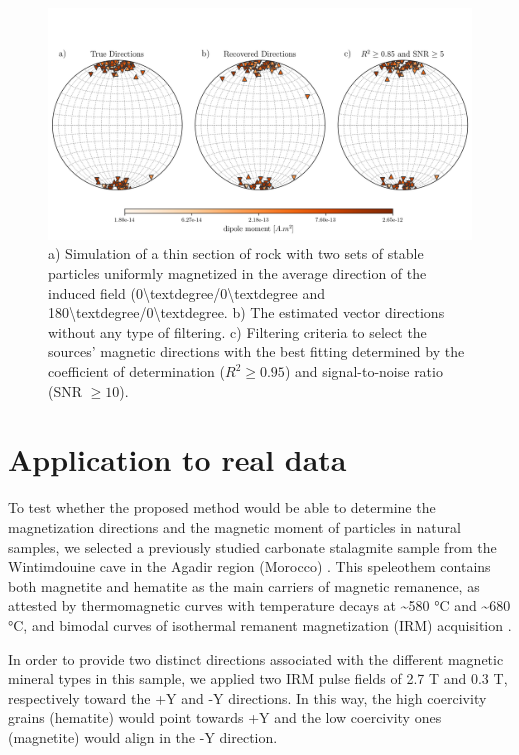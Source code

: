 \begin{figure}[htbp!]
\centering
\includegraphics[width=1\linewidth]{figures/complex-synthetic-stereograms.png}
\caption{
a) Simulation of a thin section of rock with two sets of stable particles uniformly magnetized in the average direction of the induced field (0{\textbackslash}textdegree/0{\textbackslash}textdegree and 180{\textbackslash}textdegree/0{\textbackslash}textdegree. b) The estimated vector directions without any type of filtering. c) Filtering criteria to select the sources' magnetic directions with the best fitting determined by the coefficient of determination ($R^ 2 \geq 0.95$) and signal-to-noise ratio (SNR $ \geq 10$).
}
\label{complex-synthetic-stereograms}
\end{figure}



\section{Application to real data}

To test whether the proposed method would be able to determine the
magnetization directions and the magnetic moment of particles in natural
samples, we selected a previously studied carbonate stalagmite sample from the
Wintimdouine cave in the Agadir region (Morocco) \citep{Ait2019Hydro}. This
speleothem contains both magnetite and hematite as the main carriers of
magnetic remanence, as attested by thermomagnetic curves with temperature
decays at {\textasciitilde}580 °C and {\textasciitilde}680 °C, and bimodal
curves of isothermal remanent magnetization (IRM) acquisition \citep{carmo2019speleothem}.

In order to provide two distinct directions associated with the different
magnetic mineral types in this sample, we applied two IRM pulse fields of 2.7 T
and 0.3 T, respectively toward the +Y and -Y directions. In this way, the high
coercivity grains (hematite) would point towards +Y and the low coercivity ones
(magnetite) would align in the -Y direction.

